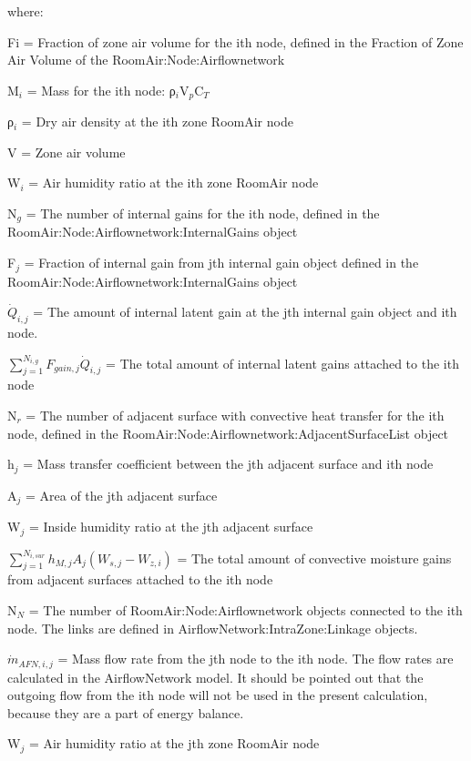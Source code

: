 where:

Fi = Fraction of zone air volume for the ith node, defined in the Fraction of Zone Air Volume of the RoomAir:Node:Airflownetwork

M\(_{i}\) = Mass for the ith node: ρ\(_{i}\)V\(_{p}\)C\(_{T}\)

ρ\(_{i}\) = Dry air density at the ith zone RoomAir node

V = Zone air volume

W\(_{i}\) = Air humidity ratio at the ith zone RoomAir node

N\(_{g}\) = The number of internal gains for the ith node, defined in the \\ RoomAir:Node:Airflownetwork:InternalGains object

F\(_{j}\) = Fraction of internal gain from jth internal gain object defined in the \\ RoomAir:Node:Airflownetwork:InternalGains object

\({\dot Q}_{i,j}\) = The amount of internal latent gain at the jth internal gain object and ith node.

\({\sum\limits_{j = 1}^{N_{i,g}} F_{gain,j}{\dot Q}_{i,j}}\) = The total amount of internal latent gains attached to the ith node

N\(_{r}\) = The number of adjacent surface with convective heat transfer for the ith node, defined in the RoomAir:Node:Airflownetwork:AdjacentSurfaceList object

h\(_{j}\) = Mass transfer coefficient between the jth adjacent surface and ith node

A\(_{j}\) = Area of the jth adjacent surface

W\(_{j}\) = Inside humidity ratio at the jth adjacent surface

\({\sum\limits_{j = 1}^{N_{i,sur}} h_{M,j} A_j \left( W_{s,j} - W_{z,i}\right)}\) = The total amount of convective moisture gains from adjacent surfaces attached to the ith node

N\(_{N}\) = The number of RoomAir:Node:Airflownetwork objects connected to the ith node. The links are defined in AirflowNetwork:IntraZone:Linkage objects.

\({\dot m}_{AFN,i,j}\) = Mass flow rate from the jth node to the ith node. The flow rates are calculated in the AirflowNetwork model. It should be pointed out that the outgoing flow from the ith node will not be used in the present calculation, because they are a part of energy balance.

W\(_{j}\) = Air humidity ratio at the jth zone RoomAir node

